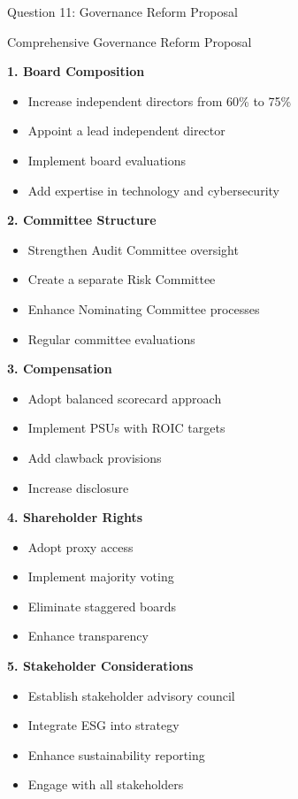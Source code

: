\documentclass[aspectratio=169]{beamer}
\newcommand{\subquestion}[1]{{\bfseries\color{darkgreen}#1}}
\begin{document}
	\begin{frame}{Question 11: Governance Reform Proposal}
		
		\begin{block}{Comprehensive Governance Reform Proposal}
			
			\subquestion{1. Board Composition}
			\begin{itemize}
				\item Increase independent directors from 60\% to 75\%
				\item Appoint a lead independent director
				\item Implement board evaluations
				\item Add expertise in technology and cybersecurity
			\end{itemize}
			
			\subquestion{2. Committee Structure}
			\begin{itemize}
				\item Strengthen Audit Committee oversight
				\item Create a separate Risk Committee
				\item Enhance Nominating Committee processes
				\item Regular committee evaluations
			\end{itemize}
			
			\subquestion{3. Compensation}
			\begin{itemize}
				\item Adopt balanced scorecard approach
				\item Implement PSUs with ROIC targets
				\item Add clawback provisions
				\item Increase disclosure
			\end{itemize}
			
			\subquestion{4. Shareholder Rights}
			\begin{itemize}
				\item Adopt proxy access
				\item Implement majority voting
				\item Eliminate staggered boards
				\item Enhance transparency
			\end{itemize}
			
			\subquestion{5. Stakeholder Considerations}
			\begin{itemize}
				\item Establish stakeholder advisory council
				\item Integrate ESG into strategy
				\item Enhance sustainability reporting
				\item Engage with all stakeholders
			\end{itemize}
		\end{block}
	\end{frame}
	
\end{document}
